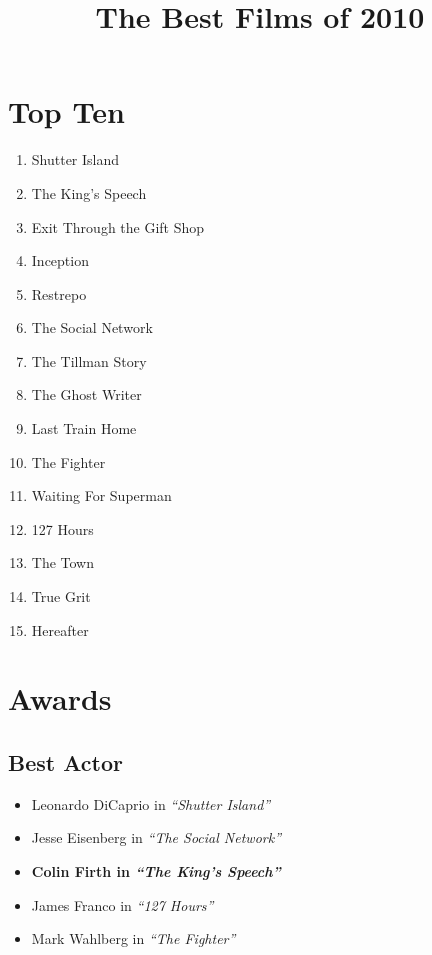 \documentclass{article}
\begin{document}
\title{The Best Films of 2010}
\date{} %
\maketitle

\begin{multicols}{2}

\section*{\color{Mahogany} Top Ten}
\begin{enumerate}
  \item Shutter Island
  \item The King's Speech
  \item Exit Through the Gift Shop
  \item Inception
  \item Restrepo
  \item The Social Network
  \item The Tillman Story
  \item The Ghost Writer
  \item Last Train Home
  \item The Fighter
  \scriptsize
  \item Waiting For Superman
  \setlength{\parskip}{0pt}
  \setlength{\itemsep}{0pt}
  \item 127 Hours
  \item The Town
  \item True Grit
  \item Hereafter
\end{enumerate}


\footnotesize
\section*{\color{Mahogany} Awards}
\subsection*{Best Actor}
  \begin{itemize}
    \setlength{\parskip}{0pt}
    \setlength{\itemsep}{0pt}
    \item[] Leonardo DiCaprio in \emph{``Shutter Island''}
    \item[] Jesse Eisenberg in \emph{``The Social Network''}
    \item \textbf{Colin Firth in \emph{``The King's Speech''}}
    \item[] James Franco in \emph{``127 Hours''}
    \item[] Mark Wahlberg in \emph{``The Fighter''}
  \end{itemize}


\end{multicols}
\end{document}
